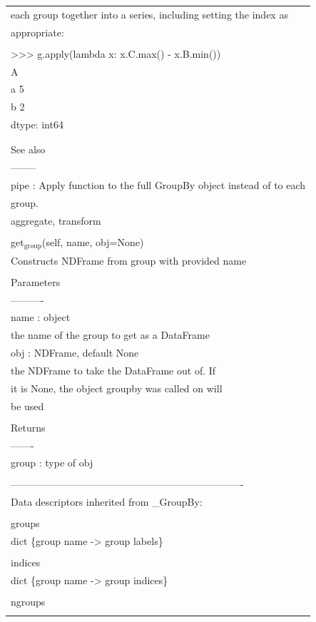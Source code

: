 \documentclass[11pt]{article}
\begin{document}
\begin{enumerate}
\begin{enumerate}
\begin{enumerate}
\begin{center}
\begin{tabular}{l}
each group together into a series, including setting the index as\\
appropriate:\\
\\
>>> g.apply(lambda x: x.C.max() - x.B.min())\\
A\\
a    5\\
b    2\\
dtype: int64\\
\\
\\
See also\\
--------\\
pipe : Apply function to the full GroupBy object instead of to each\\
group.\\
aggregate, transform\\
\\
get\(_{\text{group}}\)(self, name, obj=None)\\
Constructs NDFrame from group with provided name\\
\\
Parameters\\
----------\\
name : object\\
the name of the group to get as a DataFrame\\
obj : NDFrame, default None\\
the NDFrame to take the DataFrame out of.  If\\
it is None, the object groupby was called on will\\
be used\\
\\
Returns\\
-------\\
group : type of obj\\
\\
----------------------------------------------------------------------\\
Data descriptors inherited from \_GroupBy:\\
\\
groups\\
dict \{group name -> group labels\}\\
\\
indices\\
dict \{group name -> group indices\}\\
\\
ngroups\\
\\

\end{tabular}
\end{center}
\end{enumerate}
\end{enumerate}
\end{enumerate}
\end{document}
